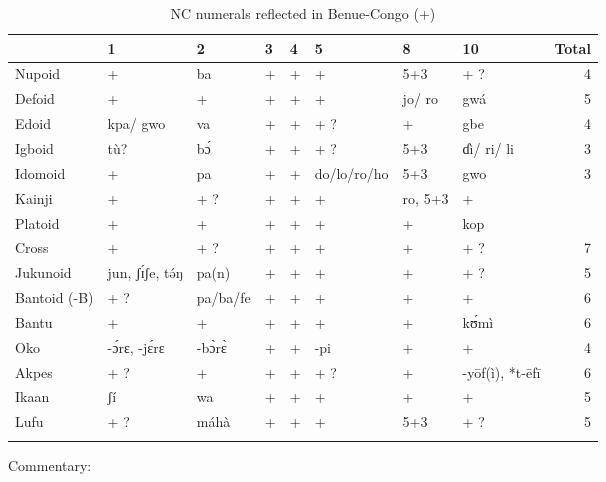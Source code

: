 \begin{table}
\caption{\label{tab:5:1}NC numerals reflected in Benue-Congo (+)}


\begin{tabularx}{\textwidth}{X QlllQlQr}
\lsptoprule
& {1} & {2} & {3} & {4} & {5} & {8} & {10} & {Total}\\
\midrule
Nupoid & {+} & {ba} & {+} & {+} & {+} & {5+3} & {+} ? & {4}\\
Defoid & {+} & {+} & {+} & {+} & {+} & {jo/} {ro} & {gwá} & {5}\\
Edoid & {kpa/} {gwo} & {va} & {+} & {+} & {+} ? & {+} & {gbe} & {4}\\
Igboid & {tù?} & {b{\'{ɔ}}} & {+} & {+} & {+} ? & {5+3} & {ɗì/} {ri/} {li} & {\color{lsMidBlue}3}\\
Idomoid & {+} & {pa} & {+} & {+} & {do/lo/ro/ho} & {5+3} & {gwo} & {\color{lsMidBlue}3}\\
Kainji & {+} & {+} ? & {+} & {+} & {+} & {ro,} {5+3} & {+} & \color{lsLightWine}{6}\\
Platoid & {+} & {+} & {+} & {+} & {+} & {+} & {kop} & \color{lsLightWine}{6}\\
Cross & {+} & {+} ? & {+} & {+} & {+} & {+} & {+} ? &\color{lsLightWine} {7}\\
Jukunoid & {jun,} {ʃ{\'{ɪ}}ʃe,}  {t{\'{ə}}ŋ} & {pa(n)} & {+} & {+} & {+} & {+} & {+} ? & {5}\\
Bantoid (-B) & {+} ? & {pa/ba/fe} & {+} & {+} & {+} & {+} & {+} &\color{lsLightWine} {6}\\
Bantu & {+} & {+} & {+} & {+} & {+} & {+} & {k{\'{ʊ}}mì} &\color{lsLightWine} {6}\\
Oko & {-{\'{ɔ}}rɛ, -j{\'{ɛ}}rɛ} & {-b{\`{ɔ}}r{\`{ɛ}}} & {+} & {+} & {-pi} & {+} & {+} & {4}\\
Akpes & {+} ? & {+} & {+} & {+} & {+} ? & {+} & {-y{\={o}}f(ì), *t-{\={e}}f{\={i}}} &\color{lsLightWine} {6}\\
Ikaan & {ʃí} & {wa} & {+} & {+} & {+} & {+} & {+} & {5}\\
Lufu & {+} ? & {máhà} & {+} & {+} & {+} & {5+3} & {+} ? & {5}\\
\lspbottomrule
\end{tabularx}
\end{table}
Commentary:


